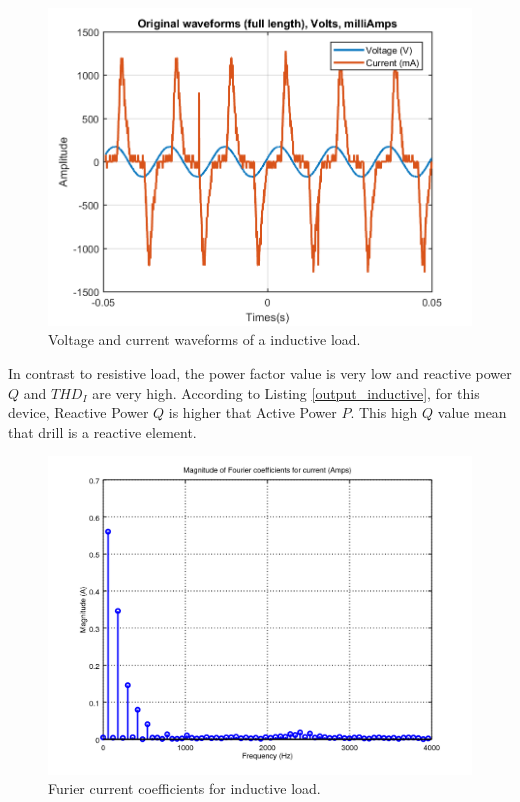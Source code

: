 \documentclass[journal]{IEEEtran}
\begin{document}
\begin{figure}[h]
\centering
\includegraphics[clip,width=\columnwidth]
{original_waveform_drill.png}
\caption{Voltage and current waveforms of a inductive load.}
\label{original_inductive_load}
\end{figure}

In contrast to resistive load, the power factor value is 
very low and reactive power $Q$ and $THD_I$ are very high.
According to Listing \ref{output_inductive},
for this device, Reactive Power $Q$ is higher that Active 
Power $P$. 
This high $Q$ value mean that drill is a reactive element. 

\begin{figure}[h]
\centering
\includegraphics[clip,width=\columnwidth]
{zoomed_current_furier_coefficients_drill.png}
\caption{Furier current coefficients for inductive load.}
\label{fourier_corrent_coefficients_inductive}
\end{figure}
\end{document}
